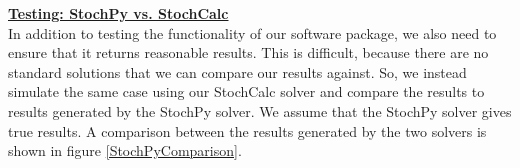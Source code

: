 \documentclass[11pt,letter]{article}
\begin{document}
\underline{\textbf{Testing: StochPy vs. StochCalc}}\\
In addition to testing the functionality of our software package, we also need to ensure that it returns reasonable results. This is difficult, because there are no standard solutions that we can compare our results against. So, we instead simulate the same case using our StochCalc solver and compare the results to results generated by the StochPy solver. We assume that the StochPy solver gives true results. A comparison between the results generated by the two solvers is shown in figure \ref{StochPyComparison}.\\

\begin{figure}
	\centering

\end{figure}
\end{document}

